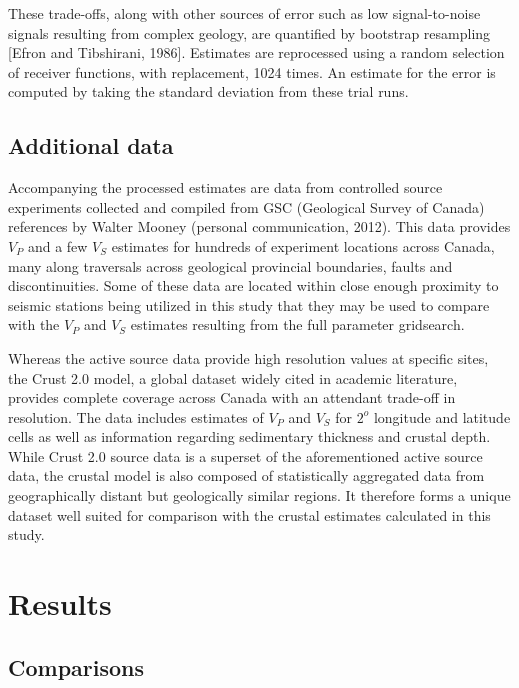 \documentclass[draft, 12pt]{article}
\begin{document}
  These trade-offs, along with other sources of error such as low signal-to-noise signals resulting from complex geology, are quantified by bootstrap resampling [Efron and Tibshirani, 1986]. Estimates are reprocessed using a random selection of receiver functions, with replacement, 1024 times. An estimate for the error is computed by taking the standard deviation from these trial runs.

\subsection{Additional data}
   Accompanying the processed estimates are data from controlled source experiments collected and compiled from GSC (Geological Survey of Canada) references by Walter Mooney (personal communication, 2012). This data provides $V_P$ and a few $V_S$ estimates for hundreds of experiment locations across Canada, many along traversals across geological provincial boundaries, faults and discontinuities. Some of these data are located within close enough proximity to seismic stations being utilized in this study that they may be used to compare with the $V_P$ and $V_S$ estimates resulting from the full parameter gridsearch.

  Whereas the active source data provide high resolution values at specific sites, the Crust 2.0 model, a global dataset widely cited in academic literature, provides complete coverage across Canada with an attendant trade-off in resolution. The data includes estimates of $V_P$ and $V_S$ for $2^o$ longitude and latitude cells as well as information regarding sedimentary thickness and crustal depth. While Crust 2.0 source data is a superset of the aforementioned active source data, the crustal model is also composed of statistically aggregated data from geographically distant but geologically similar regions. It therefore forms a unique dataset well suited for comparison with the crustal estimates calculated in this study.

\section{Results}

\subsection{Comparisons}
\end{document}
